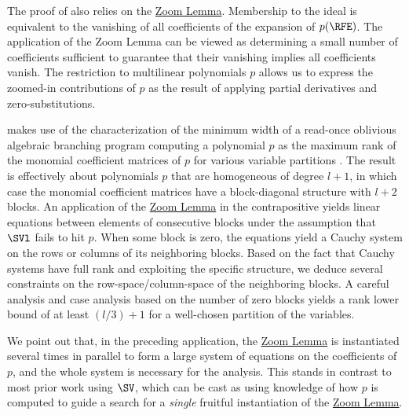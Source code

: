 The proof of  also relies on the
\hyperref[lem.multi-zsub-deriv]{Zoom Lemma}. 
Membership to the ideal is equivalent to the vanishing of all coefficients of
the expansion of $p(\RFE)$.
The application of the Zoom Lemma can be viewed as determining a small number of coefficients
sufficient to guarantee that their vanishing implies all coefficients vanish.
The restriction to multilinear polynomials $p$ allows us to express the
zoomed-in contributions of $p$ as the result of applying partial derivatives and
zero-substitutions.

 makes use of the characterization of the minimum width
of a read-once oblivious algebraic branching program computing a polynomial
$p$ as the maximum rank of the monomial coefficient matrices of $p$ for
various variable partitions \cite{Nisan1991}.
The result is effectively about polynomials \(p\) that are homogeneous of degree $l+1$,
in which case the monomial coefficient matrices have a block-diagonal structure with $l+2$ blocks.
An application of the \hyperref[lem.multi-zsub-deriv]{Zoom Lemma} in the contrapositive yields linear equations
between elements of consecutive blocks under the assumption that $\SVl$ fails to hit $p$.
When some block is zero, the equations yield a Cauchy system on the rows or columns of its
neighboring blocks. Based on the fact that Cauchy systems have full rank and exploiting the specific structure, we deduce several constraints on the row-space/column-space of the neighboring blocks. A careful analysis and case analysis based on the number of zero blocks yields a rank lower bound of at least $(l/3)+1$ for a well-chosen partition of the variables.

We point out that, in the preceding application,
the \hyperref[lem.multi-zsub-deriv]{Zoom Lemma} is instantiated several times in parallel to form a large
system of equations on the coefficients of \(p\),
and the whole system is necessary for the analysis.
This stands in contrast to most prior work using \(\SV\),
which can be cast as using knowledge of how \(p\) is computed to guide a search for a
\emph{single} fruitful instantiation of the \hyperref[lem.multi-zsub-deriv]{Zoom Lemma}.

